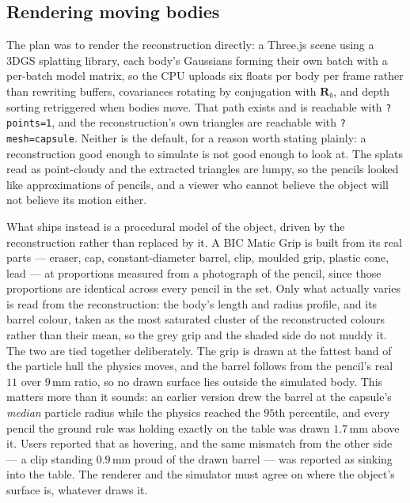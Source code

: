 \documentclass[11pt]{article}
\newcommand{\R}{\mathbf{R}}
\begin{document}
\subsection{Rendering moving bodies}
The plan was to render the reconstruction directly: a Three.js scene using a 3DGS splatting library, each body's Gaussians forming their own batch with a per-batch model matrix, so the CPU uploads six floats per body per frame rather than rewriting buffers, covariances rotating by conjugation with $\R_b$, and depth sorting retriggered when bodies move. That path exists and is reachable with \texttt{?points=1}, and the reconstruction's own triangles are reachable with \texttt{?mesh=capsule}. Neither is the default, for a reason worth stating plainly: a reconstruction good enough to simulate is not good enough to look at. The splats read as point-cloudy and the extracted triangles are lumpy, so the pencils looked like approximations of pencils, and a viewer who cannot believe the object will not believe its motion either.

What ships instead is a procedural model of the object, driven by the reconstruction rather than replaced by it. A BIC Matic Grip is built from its real parts --- eraser, cap, constant-diameter barrel, clip, moulded grip, plastic cone, lead --- at proportions measured from a photograph of the pencil, since those proportions are identical across every pencil in the set. Only what actually varies is read from the reconstruction: the body's length and radius profile, and its barrel colour, taken as the most saturated cluster of the reconstructed colours rather than their mean, so the grey grip and the shaded side do not muddy it. The two are tied together deliberately. The grip is drawn at the fattest band of the particle hull the physics moves, and the barrel follows from the pencil's real $11$ over $9$\,mm ratio, so no drawn surface lies outside the simulated body. This matters more than it sounds: an earlier version drew the barrel at the capsule's \emph{median} particle radius while the physics reached the $95$th percentile, and every pencil the ground rule was holding exactly on the table was drawn $1.7$\,mm above it. Users reported that as hovering, and the same mismatch from the other side --- a clip standing $0.9$\,mm proud of the drawn barrel --- was reported as sinking into the table. The renderer and the simulator must agree on where the object's surface is, whatever draws it.
\end{document}
